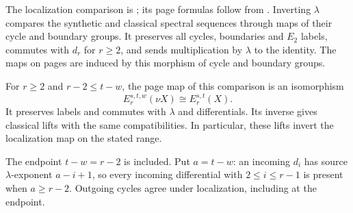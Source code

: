 \begin{proposition}
\label{sem:Literature:lambda-inversion}
\label{sem:Literature:free-lambda-range}
The localization comparison is \cite[Proposition 4.40]{Pst}; its page formulas follow from \cite[Theorem A.8 and Corollary A.9]{BHS}.
Inverting $\lambda$ compares the synthetic and classical spectral
sequences through maps of their cycle and boundary groups. It preserves all cycles,
boundaries and $E_2$ labels, commutes with $d_r$ for $r\ge2$, and sends
multiplication by $\lambda$ to the identity. The maps on pages are
induced by this morphism of cycle and boundary groups.

For $r\ge2$ and $r-2\le t-w$, the page map of this comparison is an
isomorphism
\[
 E_r^{s,t,w}(\nu X)\cong E_r^{s,t}(X).
\]
It preserves labels and commutes with $\lambda$ and differentials. Its
inverse gives classical lifts with the same compatibilities. In
particular, these lifts invert the localization map on the stated range.

The endpoint $t-w=r-2$ is included. Put $a=t-w$: an incoming $d_i$ has
source $\lambda$-exponent $a-i+1$, so every incoming differential with
$2\le i\le r-1$ is present when $a\ge r-2$. Outgoing cycles agree under
localization, including at the endpoint.

\end{proposition}



